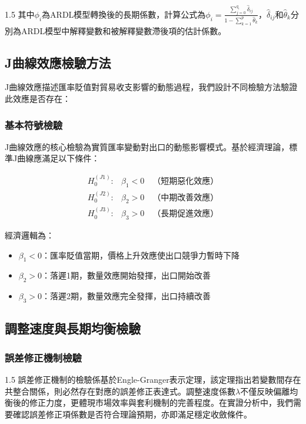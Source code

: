 \documentclass[a4paper,12pt]{article}
\begin{document}
\begin{spacing}{1.5}
其中$\phi_i$為ARDL模型轉換後的長期係數，計算公式為$\phi_i = \frac{\sum_{j=0}^{q_i} \hat{\delta}_{ij}}{1-\sum_{k=1}^{p} \hat{\theta}_k}$，$\hat{\delta}_{ij}$和$\hat{\theta}_k$分別為ARDL模型中解釋變數和被解釋變數滯後項的估計係數。
\end{spacing}

\subsection{J曲線效應檢驗方法}
J曲線效應描述匯率貶值對貿易收支影響的動態過程，我們設計不同檢驗方法驗證此效應是否存在：

\subsubsection{基本符號檢驗}

J曲線效應的核心檢驗為實質匯率變動對出口的動態影響模式。基於經濟理論，標準J曲線應滿足以下條件：

\vspace{-1cm}

\begin{align}
H_0^{(J1)}: &\beta_1 < 0 \quad \text{（短期惡化效應）} \label{eq:j1} \\
H_0^{(J2)}: &\beta_2 > 0 \quad \text{（中期改善效應）} \label{eq:j2} \\
H_0^{(J3)}: &\beta_3 > 0 \quad \text{（長期促進效應）} \label{eq:j3}
\end{align}

經濟邏輯為：
\begin{itemize}
\item $\beta_1 < 0$：匯率貶值當期，價格上升效應使出口競爭力暫時下降
\item $\beta_2 > 0$：落遲1期，數量效應開始發揮，出口開始改善
\item $\beta_3 > 0$：落遲2期，數量效應完全發揮，出口持續改善
\end{itemize}


\subsection{調整速度與長期均衡檢驗}

\subsubsection{誤差修正機制檢驗}
\begin{spacing}{1.5}
誤差修正機制的檢驗係基於Engle-Granger表示定理，該定理指出若變數間存在共整合關係，則必然存在對應的誤差修正表達式。調整速度係數$\lambda$不僅反映偏離均衡後的修正力度，更體現市場效率與套利機制的完善程度。在實證分析中，我們需要確認誤差修正項係數是否符合理論預期，亦即滿足穩定收斂條件。
\end{spacing}
\end{document}
